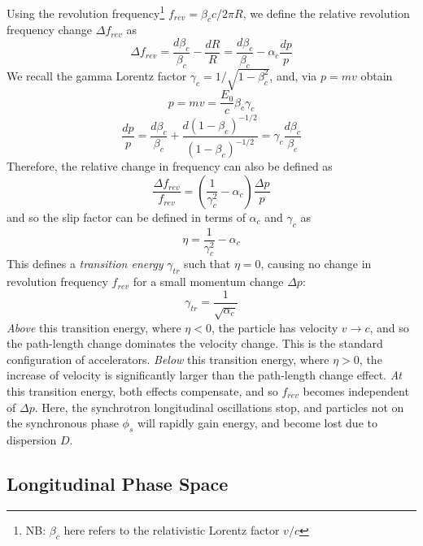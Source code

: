 \documentclass[11pt]{report}
\begin{document}
Using the revolution frequency\footnote{NB: $\beta_c$ here refers to the relativistic Lorentz factor $v/c$ } $f_{rev}=\beta_c c/2\pi R$, we define the relative revolution frequency change $\Delta f_{rev}$ as
\begin{equation}
  \Delta f_{rev} = \frac{d\beta_c}{\beta_c}-\frac{dR}R=\frac{d\beta_c}{\beta_c}-\alpha_c\frac{dp}p
\end{equation} 
We recall the gamma Lorentz factor $\gamma_c =1/\sqrt{1-\beta_c^2}$, and, via $p=mv$ obtain
\begin{equation}
  p=mv=\frac {E_0}c \beta_c\gamma_c
\end{equation}
\begin{equation}
  \frac{dp}p =\frac{d\beta_c}{\beta_c}+\frac{d(1-\beta_c)^{-1/2}}{(1-\beta_c)^{-1/2}}=\gamma_c\frac{d\beta_c}{\beta_c}
\end{equation}
Therefore, the relative change in frequency can also be defined as
\begin{equation}
  \frac{\Delta f_{rev}}{f_{rev}}=\left(\frac 1{\gamma_c^2}-\alpha_c\right)\frac{\Delta p}p
\end{equation}
and so the slip factor can be defined in terms of $\alpha_c$ and $\gamma_c$ as
\begin{equation}
  \eta = \frac 1{\gamma_c^2}-\alpha_c
\end{equation}
This defines a \textit{transition energy} $\gamma_{tr}$ such that $\eta=0$, causing no change in revolution frequency $f_{rev}$ for a small momentum change $\Delta p$:
\begin{equation}
  \gamma_{tr}=\frac 1{\sqrt{\alpha_c}}
\end{equation}
\textit{Above} this transition energy, where $\eta<0$, the particle has velocity $v\rightarrow c$, and so the path-length change dominates the velocity change. This is the standard configuration of accelerators.
\textit{Below} this transition energy, where $\eta >0$, the increase of velocity is significantly larger than the path-length change effect.
\textit{At} this transition energy, both effects compensate, and so $f_{rev}$ becomes independent of $\Delta p$. Here, the synchrotron longitudinal oscillations stop, and particles not on the synchronous phase $\phi_s$ will rapidly gain energy, and become lost due to dispersion $D$.

\subsection{Longitudinal Phase Space}
\end{document}
